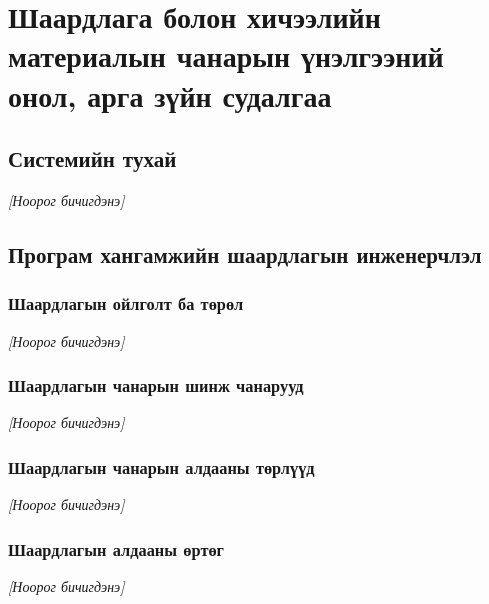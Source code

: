 
\chapter{Шаардлага болон хичээлийн материалын чанарын үнэлгээний онол, арга зүйн судалгаа}
\label{Chapter1}

\newcommand{\keyword}[1]{\textbf{#1}}
\newcommand{\tabhead}[1]{\textbf{#1}}
\newcommand{\code}[1]{\texttt{#1}}
\newcommand{\file}[1]{\texttt{\bfseries#1}}
\newcommand{\option}[1]{\texttt{\itshape#1}}
\newcommand{\ph}{\textit{[Ноорог бичигдэнэ]}}

\section{Системийн тухай} %
\ph

\section{Програм хангамжийн шаардлагын инженерчлэл} %
\subsection{Шаардлагын ойлголт ба төрөл}
\ph
\subsection{Шаардлагын чанарын шинж чанарууд}
\ph
\subsection{Шаардлагын чанарын алдааны төрлүүд}
\ph
\subsection{Шаардлагын алдааны өртөг}
\ph

